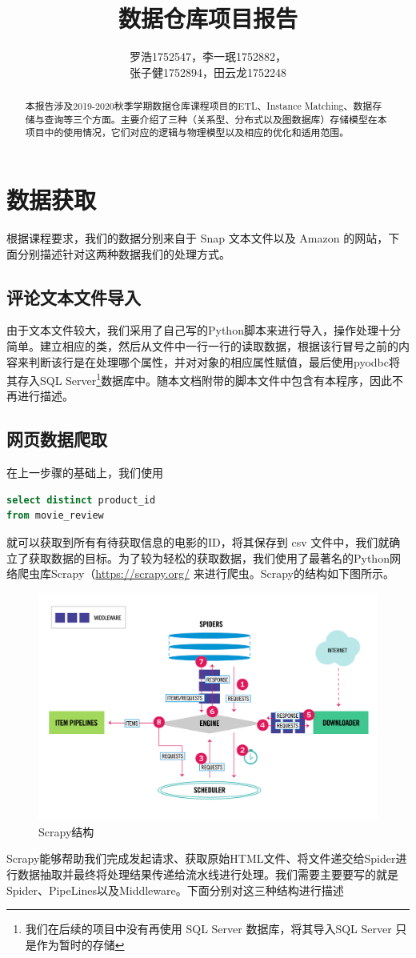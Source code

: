 \documentclass{ctexrep}
\title{\textbf{数据仓库项目报告}}
\author{罗浩1752547，李一珉1752882，\\张子健1752894，田云龙1752248}
\date{}
\begin{document}
	\maketitle
	\begin{abstract}
		本报告涉及2019-2020秋季学期数据仓库课程项目的ETL、Instance Matching、数据存储与查询等三个方面。主要介绍了三种（关系型、分布式以及图数据库）存储模型在本项目中的使用情况，它们对应的逻辑与物理模型以及相应的优化和适用范围。
	\end{abstract}
	\tableofcontents
	
	\chapter{数据获取}
	根据课程要求，我们的数据分别来自于 Snap 文本文件以及 Amazon 的网站，下面分别描述针对这两种数据我们的处理方式。
	\section{评论文本文件导入}
	由于文本文件较大，我们采用了自己写的Python脚本来进行导入，操作处理十分简单。建立相应的类，然后从文件中一行一行的读取数据，根据该行冒号之前的内容来判断该行是在处理哪个属性，并对对象的相应属性赋值，最后使用pyodbc将其存入SQL Server\footnote{我们在后续的项目中没有再使用 SQL Server 数据库，将其导入SQL Server 只是作为暂时的存储}数据库中。随本文档附带的脚本文件中包含有本程序，因此不再进行描述。
	\section{网页数据爬取}
	在上一步骤的基础上，我们使用 \begin{lstlisting}[language=sql]
select distinct product_id
from movie_review
	\end{lstlisting}
	就可以获取到所有有待获取信息的电影的ID，将其保存到 csv 文件中，我们就确立了获取数据的目标。为了较为轻松的获取数据，我们使用了最著名的Python网络爬虫库Scrapy（\url{https://scrapy.org/} 来进行爬虫。Scrapy的结构如下图所示。
	\begin{figure}[H]
		\centering
		\includegraphics[width=0.7\linewidth]{img/scrapy_architecture_02}
		\caption{Scrapy结构}
		\label{fig:scrapyarchitecture02}
	\end{figure}
	Scrapy能够帮助我们完成发起请求、获取原始HTML文件、将文件递交给Spider进行数据抽取并最终将处理结果传递给流水线进行处理。我们需要主要要写的就是 Spider、PipeLines以及Middleware。下面分别对这三种结构进行描述
\end{document}
